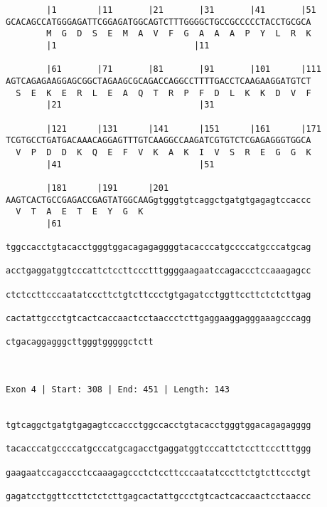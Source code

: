 \documentclass{article}
\begin{document}
\begin{Verbatim}
        |1        |11       |21       |31       |41       |51
GCACAGCCATGGGAGATTCGGAGATGGCAGTCTTTGGGGCTGCCGCCCCCTACCTGCGCA
        M  G  D  S  E  M  A  V  F  G  A  A  A  P  Y  L  R  K
        |1                           |11                   
  
        |61       |71       |81       |91       |101      |111
AGTCAGAGAAGGAGCGGCTAGAAGCGCAGACCAGGCCTTTTGACCTCAAGAAGGATGTCT
  S  E  K  E  R  L  E  A  Q  T  R  P  F  D  L  K  K  D  V  F
        |21                           |31                   
  
        |121      |131      |141      |151      |161      |171
TCGTGCCTGATGACAAACAGGAGTTTGTCAAGGCCAAGATCGTGTCTCGAGAGGGTGGCA
  V  P  D  D  K  Q  E  F  V  K  A  K  I  V  S  R  E  G  G  K
        |41                           |51                   
  
        |181      |191      |201                            
AAGTCACTGCCGAGACCGAGTATGGCAAGgtgggtgtcaggctgatgtgagagtccaccc
  V  T  A  E  T  E  Y  G  K                                 
        |61                                                 
  
tggccacctgtacacctgggtggacagagaggggtacacccatgccccatgcccatgcag
                                                            
acctgaggatggtcccattctccttccctttggggaagaatccagaccctccaaagagcc
                                                            
ctctccttcccaatatcccttctgtcttccctgtgagatcctggttccttctctcttgag
                                                            
cactattgccctgtcactcaccaactcctaaccctcttgaggaaggagggaaagcccagg
                                                            
ctgacaggagggcttgggtgggggctctt
                             
                             
 
Exon 4 | Start: 308 | End: 451 | Length: 143


tgtcaggctgatgtgagagtccaccctggccacctgtacacctgggtggacagagagggg
                                                            
tacacccatgccccatgcccatgcagacctgaggatggtcccattctccttccctttggg
                                                            
gaagaatccagaccctccaaagagccctctccttcccaatatcccttctgtcttccctgt
                                                            
gagatcctggttccttctctcttgagcactattgccctgtcactcaccaactcctaaccc
                                                            

\end{Verbatim}
\end{document}
